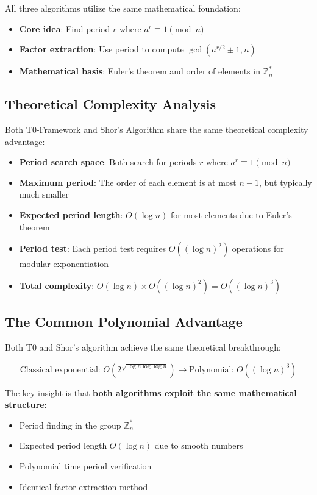 	All three algorithms utilize the same mathematical foundation:
	
	\begin{itemize}
		\item \textbf{Core idea}: Find period $r$ where $a^r \equiv 1 \pmod{n}$
		\item \textbf{Factor extraction}: Use period to compute $\gcd(a^{r/2} \pm 1, n)$
		\item \textbf{Mathematical basis}: Euler's theorem and order of elements in $\mathbb{Z}_n^*$
	\end{itemize}
	
	\subsection{Theoretical Complexity Analysis}
	
	Both T0-Framework and Shor's Algorithm share the same theoretical complexity advantage:
	
	\begin{itemize}
		\item \textbf{Period search space}: Both search for periods $r$ where $a^r \equiv 1 \pmod{n}$
		\item \textbf{Maximum period}: The order of each element is at most $n-1$, but typically much smaller
		\item \textbf{Expected period length}: $O(\log n)$ for most elements due to Euler's theorem
		\item \textbf{Period test}: Each period test requires $O((\log n)^2)$ operations for modular exponentiation
		\item \textbf{Total complexity}: $O(\log n) \times O((\log n)^2) = O((\log n)^3)$
	\end{itemize}
	
	\subsection{The Common Polynomial Advantage}
	
	Both T0 and Shor's algorithm achieve the same theoretical breakthrough:
	
	\begin{equation}
		\text{Classical exponential: } O(2^{\sqrt{\log n \log \log n}}) \rightarrow \text{Polynomial: } O((\log n)^3)
	\end{equation}
	
	The key insight is that \textbf{both algorithms exploit the same mathematical structure}:
	\begin{itemize}
		\item Period finding in the group $\mathbb{Z}_n^*$
		\item Expected period length $O(\log n)$ due to smooth numbers
		\item Polynomial time period verification
		\item Identical factor extraction method
	\end{itemize}
	
